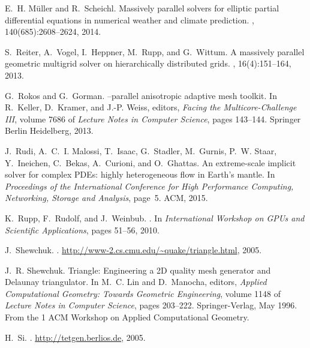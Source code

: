\documentclass[]{siamart0216}
\begin{document}
\begin{thebibliography}{10}
E.~H. M{\"u}ller and R.~Scheichl.
\newblock Massively parallel solvers for elliptic partial differential
  equations in numerical weather and climate prediction.
,
  140(685):2608--2624, 2014.

S.~Reiter, A.~Vogel, I.~Heppner, M.~Rupp, and G.~Wittum.
\newblock A massively parallel geometric multigrid solver on hierarchically
  distributed grids.
, 16(4):151--164, 2013.

G.~Rokos and G.~Gorman.
--parallel anisotropic adaptive mesh toolkit.
\newblock In R.~Keller, D.~Kramer, and J.-P. Weiss, editors, {\em Facing the
  Multicore-Challenge III}, volume 7686 of {\em Lecture Notes in Computer
  Science}, pages 143--144. Springer Berlin Heidelberg, 2013.

J.~Rudi, A.~C.~I. Malossi, T.~Isaac, G.~Stadler, M.~Gurnis, P.~W. Staar,
  Y.~Ineichen, C.~Bekas, A.~Curioni, and O.~Ghattas.
\newblock An extreme-scale implicit solver for complex {PDEs}: highly
  heterogeneous flow in {E}arth's mantle.
\newblock In {\em Proceedings of the International Conference for High
  Performance Computing, Networking, Storage and Analysis}, page~5. ACM, 2015.

K.~Rupp, F.~Rudolf, and J.~Weinbub.
.
\newblock In {\em International Workshop on GPUs and Scientific Applications},
  pages 51--56, 2010.

J.~{Shewchuk}.
.
\newblock \url{http://www-2.cs.cmu.edu/~quake/triangle.html}, 2005.

J.~R. Shewchuk.
\newblock Triangle: {E}ngineering a {2D} quality mesh generator and {D}elaunay
  triangulator.
\newblock In M.~C. Lin and D.~Manocha, editors, {\em Applied Computational
  Geometry: Towards Geometric Engineering}, volume 1148 of {\em Lecture Notes
  in Computer Science}, pages 203--222. Springer-Verlag, May 1996.
\newblock From the 1 ACM Workshop on Applied Computational
  Geometry.

H.~{Si}.
.
\newblock \url{http://tetgen.berlios.de}, 2005.


\end{thebibliography}
\end{document}
